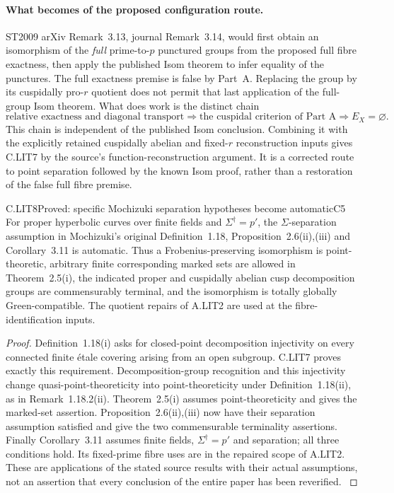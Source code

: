 \paragraph{What becomes of the proposed configuration route.}
ST2009 arXiv Remark~3.13, journal Remark~3.14, would first obtain
an isomorphism of the \emph{full} prime-to-$p$ punctured groups
from the proposed full fibre exactness, then apply the published
Isom theorem to infer equality of the punctures. The full
exactness premise is false by Part~A. Replacing the group by its
cuspidally pro-$r$ quotient does not permit that last application
of the full-group Isom theorem. What does work is the distinct
chain
\[
 \text{relative exactness and diagonal transport}
 \Longrightarrow
 \text{the cuspidal criterion of Part A}
 \Longrightarrow E_X=\varnothing.
\]
This chain is independent of the published Isom conclusion.
Combining it with the explicitly retained cuspidally abelian
and fixed-$r$ reconstruction inputs gives C.LIT7 by the source's
function-reconstruction argument. It is a corrected route to
point separation followed by the known Isom proof, rather than
a restoration of the false full fibre premise.

\begin{claim}{C.LIT8}{Proved: specific Mochizuki separation hypotheses become automatic}{C5}
For proper hyperbolic curves over finite fields and
$\Sigma^\dagger=p'$, the $\Sigma$-separation assumption in
Mochizuki's original Definition~1.18, Proposition~2.6(ii),(iii)
and Corollary~3.11 is automatic. Thus a Frobenius-preserving
isomorphism is point-theoretic, arbitrary finite corresponding
marked sets are allowed in Theorem~2.5(i), the indicated proper
and cuspidally abelian cusp decomposition groups are
commensurably terminal, and the isomorphism is totally globally
Green-compatible. The quotient repairs of A.LIT2
are used at the fibre-identification inputs.
\end{claim}
\begin{proof}
Definition~1.18(i) asks for closed-point decomposition
injectivity on every connected finite \'etale covering arising
from an open subgroup. C.LIT7 proves exactly this requirement.
Decomposition-group recognition and this injectivity change
quasi-point-theoreticity into point-theoreticity under
Definition~1.18(ii), as in Remark~1.18.2(ii). Theorem~2.5(i)
assumes point-theoreticity and gives the marked-set assertion.
Proposition~2.6(ii),(iii) now have their separation assumption
satisfied and give the two commensurable terminality assertions.
Finally Corollary~3.11 assumes finite fields,
$\Sigma^\dagger=p'$ and separation; all three conditions hold.
Its fixed-prime fibre uses are in the repaired scope of A.LIT2.
These are applications of the stated source results with their
actual assumptions, not an assertion that every conclusion of
the entire paper has been reverified.
\citep[Definition~1.18, Remark~1.18.2, Theorem~2.5(i),
Proposition~2.6(ii),(iii), Corollary~3.11]{LA_Mochizuki2007}
\end{proof}

